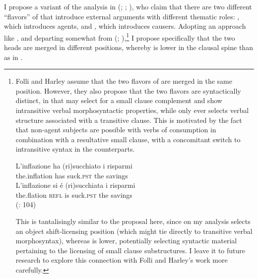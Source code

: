 \documentclass[output=paper,colorlinks,citecolor=brown]{langscibook}
\begin{document}
I propose a variant of the analysis in \citeauthor{gt:Folli:2005} (\citeyear{gt:Folli:2005}; \citeyear{gt:Folli:2006}; \citeyear{gt:Folli:2007}), who claim that there are two different ``flavors'' of  that introduce external arguments with different thematic roles: , which introduces agents, and , which introduces causers. Adopting an approach like \citet{gt:Ramchand:2008}, and departing somewhat from \citeauthor{gt:Folli:2005} (\citeyear{gt:Folli:2005}; \citeyear{gt:Folli:2007}),\footnote{Folli and Harley assume that the two flavors of  are merged in the same position. However, they also propose that the two flavors are syntactically distinct, in that  may select for a small clause complement and show intransitive verbal morphosyntactic properties, while  only ever selects verbal structure associated with a transitive clause. This is motivated by the fact that non-agent subjects are possible with verbs of consumption in combination with a resultative small clause, with a concomitant switch to intransitive syntax in the  counterparts. 


\ea \label{res2}
\ea
\gll *L'inflazione ha (ri)succhiato i risparmi \\
the.inflation has suck.\textsc{pst} the savings \\
\ex \gll L'inflazione si \'e (ri)succhiata i risparmi \\
the.flation  \textsc{refl} is suck.\textsc{pst} the savings \\
\hfill (\citealt{gt:Folli:2005}: 104)
\z
\z

\noindent This is tantalisingly similar to the proposal here, since on my analysis  selects an object shift-licensing position (which might tie directly to transitive verbal morphosyntax), whereas  is lower, potentially selecting syntactic material pertaining to the licensing of small clause substructures. I leave it to future research to explore this connection with Folli and Harley's work more carefully.} I propose specifically that the two  heads are merged in different positions, whereby   is lower in the clausal spine than  as in . 
\end{document}
